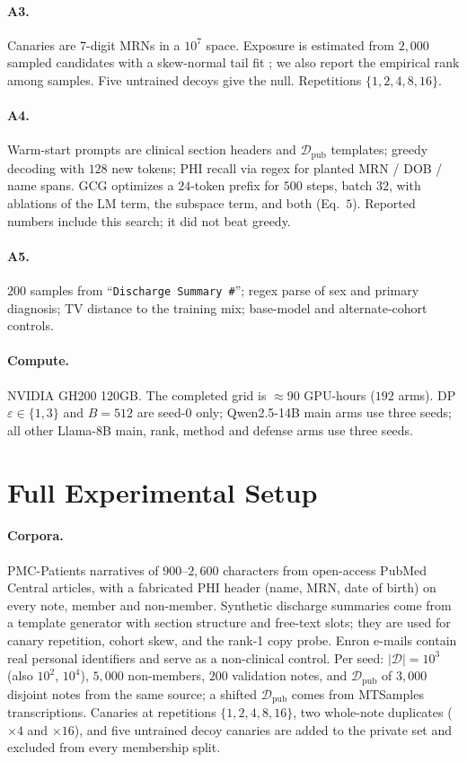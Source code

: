 \documentclass[11pt]{article}
\newcommand{\D}{\mathcal{D}}
\theoremstyle{plain}
\theoremstyle{definition}
\begin{document}
\paragraph{A3.}
Canaries are 7-digit MRNs in a $10^7$ space. Exposure is estimated from
$2{,}000$ sampled candidates with a skew-normal tail fit
\citep{carlini2019secret}; we also report the empirical rank among
samples. Five untrained decoys give the null. Repetitions
$\{1,2,4,8,16\}$.

\paragraph{A4.}
Warm-start prompts are clinical section headers and $\D_{\text{pub}}$
templates; greedy decoding with $128$ new tokens; PHI recall via regex
for planted MRN / DOB / name spans. GCG \citep{zou2023gcg} optimizes a
$24$-token prefix for $500$ steps, batch $32$, with ablations of the LM
term, the subspace term, and both (Eq.~$5$). Reported numbers include
this search; it did not beat greedy.

\paragraph{A5.}
$200$ samples from ``\texttt{Discharge Summary \#}''; regex parse of sex
and primary diagnosis; TV distance to the training mix; base-model and
alternate-cohort controls.

\paragraph{Compute.}
NVIDIA GH200 120GB. The completed grid is $\approx$90 GPU-hours
($192$ arms). DP $\varepsilon\in\{1,3\}$ and $B{=}512$ are seed-$0$
only; Qwen2.5-14B main arms use three seeds; all other Llama-8B main,
rank, method and defense arms use three seeds.

\section{Full Experimental Setup}\label{app:setup}

\paragraph{Corpora.}
PMC-Patients narratives of $900$--$2{,}600$ characters from open-access PubMed Central articles, with a fabricated PHI header (name, MRN, date of birth) on every note, member and non-member.
Synthetic discharge summaries come from a template generator with section structure and free-text slots; they are used for canary repetition, cohort skew, and the rank-1 copy probe.
Enron e-mails contain real personal identifiers and serve as a non-clinical control.
Per seed: $|\D|{=}10^3$ (also $10^2$, $10^4$), $5{,}000$ non-members, $200$ validation notes, and $\D_{\text{pub}}$ of $3{,}000$ disjoint notes from the same source; a shifted $\D_{\text{pub}}$ comes from MTSamples transcriptions.
Canaries at repetitions $\{1,2,4,8,16\}$, two whole-note duplicates ($\times4$ and $\times16$), and five untrained decoy canaries are added to the private set and excluded from every membership split.
\end{document}
